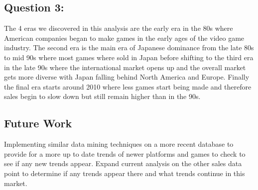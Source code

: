 \documentclass[conference]{IEEEtran}
\begin{document}
\subsection{Question 3:}
The 4 eras we discovered in this analysis are the early era in the 80s where American companies began to make games in the early ages of the video game industry. The second era is the main era of Japanese dominance from the late 80s to mid 90s where most games where sold in Japan before shifting to the third era in the late 90s where the international market opens up and the overall market gets more diverse with Japan falling behind North America and Europe. Finally the final era starts around 2010 where less games start being made and therefore sales begin to slow down but still remain higher than in the 90s.
\subsection{Future Work}
Implementing similar data mining techniques on a more recent database to provide for a more up to date trends of newer platforms and games to check to see if any new trends appear. Expand current analysis on the other sales data point to determine if any trends appear there and what trends continue in this market. 
\end{document}

